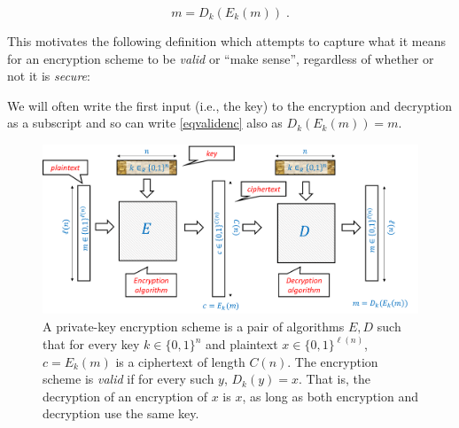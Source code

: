 \begin{equation*}
m = D_k(E_k(m)) \;.
\end{equation*}

This motivates the following definition which attempts to capture what
it means for an encryption scheme to be \emph{valid} or ``make sense'',
regardless of whether or not it is \emph{secure}:

\hypertarget{encryptiondef}{}

We will often write the first input (i.e., the key) to the encryption
and decryption as a subscript and so can write \eqref{eqvalidenc} also
as \(D_k(E_k(m))=m\).

\begin{figure}
\centering
\includegraphics[width=\textwidth, height=0.25\paperheight, keepaspectratio]{../figure/valid_encryption_fig.png}
\caption{A private-key encryption scheme is a pair of algorithms \(E,D\)
such that for every key \(k\in \{0,1\}^n\) and plaintext
\(x\in \{0,1\}^{\ell(n)}\), \(c=E_k(m)\) is a ciphertext of length
\(C(n)\). The encryption scheme is \emph{valid} if for every such \(y\),
\(D_k(y)=x\). That is, the decryption of an encryption of \(x\) is
\(x\), as long as both encryption and decryption use the same key.}
\label{validencryption}
\end{figure}


